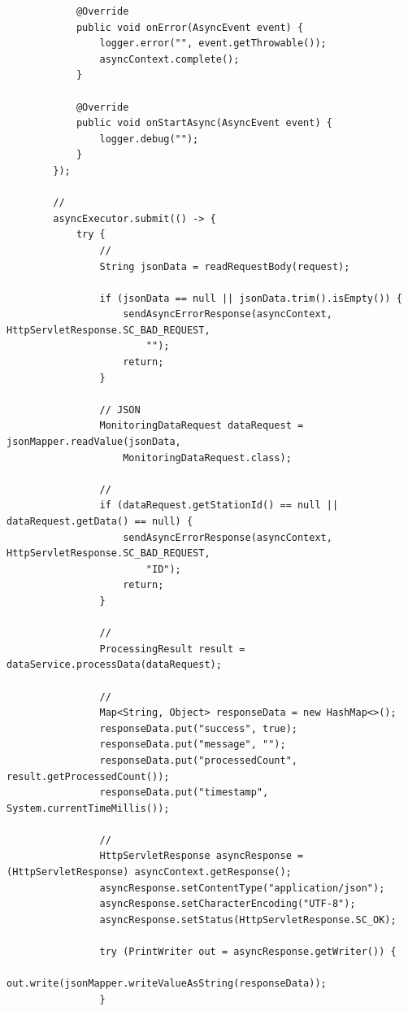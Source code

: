 \begin{verbatim}
            @Override
            public void onError(AsyncEvent event) {
                logger.error("", event.getThrowable());
                asyncContext.complete();
            }
            
            @Override
            public void onStartAsync(AsyncEvent event) {
                logger.debug("");
            }
        });
        
        // 
        asyncExecutor.submit(() -> {
            try {
                // 
                String jsonData = readRequestBody(request);
                
                if (jsonData == null || jsonData.trim().isEmpty()) {
                    sendAsyncErrorResponse(asyncContext, HttpServletResponse.SC_BAD_REQUEST, 
                        "");
                    return;
                }
                
                // JSON
                MonitoringDataRequest dataRequest = jsonMapper.readValue(jsonData, 
                    MonitoringDataRequest.class);
                
                // 
                if (dataRequest.getStationId() == null || dataRequest.getData() == null) {
                    sendAsyncErrorResponse(asyncContext, HttpServletResponse.SC_BAD_REQUEST, 
                        "ID");
                    return;
                }
                
                // 
                ProcessingResult result = dataService.processData(dataRequest);
                
                // 
                Map<String, Object> responseData = new HashMap<>();
                responseData.put("success", true);
                responseData.put("message", "");
                responseData.put("processedCount", result.getProcessedCount());
                responseData.put("timestamp", System.currentTimeMillis());
                
                // 
                HttpServletResponse asyncResponse = (HttpServletResponse) asyncContext.getResponse();
                asyncResponse.setContentType("application/json");
                asyncResponse.setCharacterEncoding("UTF-8");
                asyncResponse.setStatus(HttpServletResponse.SC_OK);
                
                try (PrintWriter out = asyncResponse.getWriter()) {
                    out.write(jsonMapper.writeValueAsString(responseData));
                }
                

\end{verbatim}
